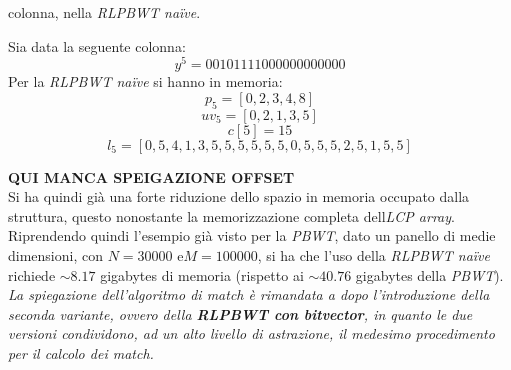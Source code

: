 colonna, nella \textit{RLPBWT na\"{i}ve}.
\begin{esempio}
  Sia data la seguente colonna:
  \[y^5=00101111000000000000\]
  Per la \textit{RLPBWT na\"{i}ve} si hanno in memoria:
  \[p_5=[0,2,3,4,8]\]
  \[uv_5=[0,2,1,3,5]\]
  \[c[5]=15\]
  \[l_5=[0,5,4,1,3,5,5,5,5,5,5,0,5,5,5,2,5,1,5,5]\]
\end{esempio}
\textbf{QUI MANCA SPEIGAZIONE OFFSET}\\
Si ha quindi già una forte riduzione dello spazio in memoria occupato dalla
struttura, questo nonostante la memorizzazione completa dell\textit{LCP array}.
Riprendendo quindi l'esempio già visto per la \textit{PBWT}, dato un panello di
medie dimensioni, con $N = 30000$ e$ M = 100000$, si ha che l'uso della
\textit{RLPBWT na\"{i}ve} richiede $\sim 8.17$ gigabytes di memoria (rispetto ai
$\sim 40.76$ gigabytes della \textit{PBWT}).\\
\textit{La spiegazione dell'algoritmo di match è rimandata a dopo l'introduzione
  della seconda variante, ovvero della \textbf{RLPBWT con bitvector}, in quanto
  le due versioni condividono, ad un alto livello di astrazione, il medesimo
  procedimento per il calcolo dei match.}